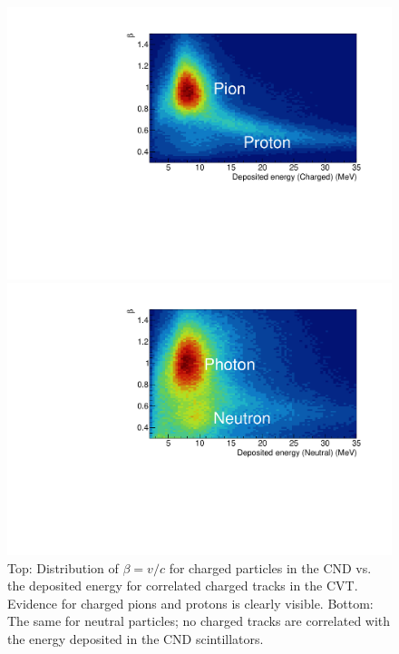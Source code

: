 \documentclass[final,3p,twocolumn]{elsarticle}
\begin{document}
\begin{figure}[t!]
\centerline{\includegraphics[width=1.\columnwidth]{CND-BetaE.pdf}}
\centerline{\includegraphics[width=1.\columnwidth]{CND-BetaENeutral.pdf}}
\caption{Top: Distribution of $\beta=v/c$ for charged particles in the CND vs. the deposited energy for correlated
  charged tracks in the CVT. Evidence for charged pions and protons is clearly visible. Bottom: The same for neutral
  particles; no charged tracks are correlated with the energy deposited in the CND scintillators.} 
\label{CND-neutrals}
\end{figure} 
\end{document}
